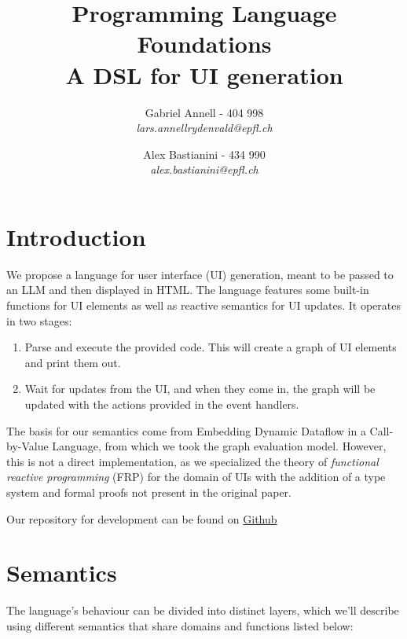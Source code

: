 \documentclass{article}
\title{
  Programming Language Foundations \\
  A DSL for UI generation
}
\author{
  Gabriel Annell - 404 998\\
  \small{\textit{lars.annellrydenvald@epfl.ch}} \and Alex Bastianini - 434 990\\
  \small{\textit{alex.bastianini@epfl.ch}}
}
\begin{document}
\maketitle
\tableofcontents

\section{Introduction}

We propose a language for user interface (UI) generation, meant to be passed to an LLM and then displayed in HTML. The language features some built-in functions for UI elements as well as reactive semantics for UI updates. It operates in two stages:

\begin{enumerate}
	\item Parse and execute the provided code. This will create a graph of UI elements and print them out.
	\item Wait for updates from the UI, and when they come in, the graph will be updated with the actions provided in the event handlers.
\end{enumerate}

\noindent The basis for our semantics come from Embedding Dynamic Dataflow in a Call-by-Value Language\cite{10.1007/11693024_20}, from which we took the graph evaluation model. However, this is not a direct implementation, as we specialized the theory of \textit{functional reactive programming} (FRP) for the domain of UIs with the addition of a type system and formal proofs not present in the original paper.

\noindent Our repository for development can be found on \href{https://github.com/LGabAnnell/cs-462-project}{Github}

\section{Semantics}
The language's behaviour can be divided into distinct layers, which we'll describe using different semantics that share domains and functions listed below:
\end{document}
